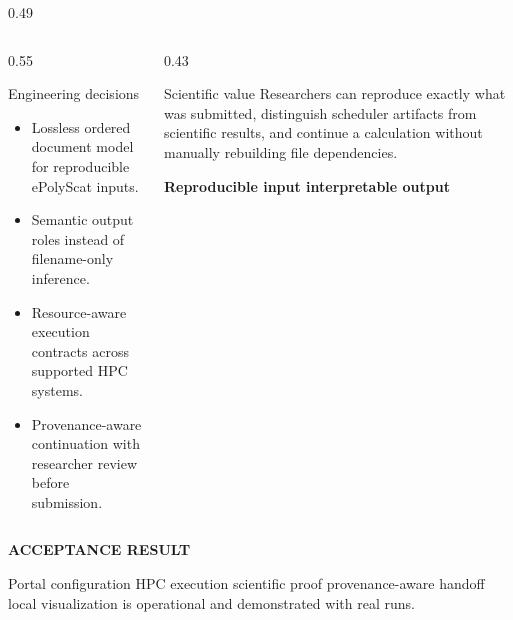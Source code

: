 \documentclass[final]{beamer}
\newcommand{\SmallCaps}[1]{%
  {\fontsize{15}{18}\selectfont\bfseries\color{PosterTealDark}\MakeUppercase{#1}}}
\begin{document}
\begin{frame}[t]
\begin{columns}[T,totalwidth=\textwidth]
\begin{column}{0.49\textwidth}
      \vspace{0.35cm}
      \begin{columns}[T,totalwidth=\linewidth]
        \begin{column}{0.55\linewidth}
          \begin{contentbox}[height=5.0cm]{Engineering decisions}
            {\fontsize{14.8}{17.2}\selectfont
            \begin{itemize}
              \setlength{\itemsep}{0cm}
              \item Lossless ordered document model for reproducible ePolyScat inputs.
              \item Semantic output roles instead of filename-only inference.
              \item Resource-aware execution contracts across supported HPC systems.
              \item Provenance-aware continuation with researcher review before submission.
            \end{itemize}}
          \end{contentbox}
        \end{column}
        \begin{column}{0.43\linewidth}
          \begin{contentbox}[height=5.0cm]{Scientific value}
            {\fontsize{14.5}{17.2}\selectfont
              Researchers can reproduce exactly what was submitted, distinguish scheduler artifacts from scientific results, and continue a calculation without manually rebuilding file dependencies.}
            \par\vspace{0.12cm}
            {\fontsize{12.5}{15}\selectfont\bfseries\color{PosterTealDark}
              Reproducible input \textrightarrow{} interpretable output}
          \end{contentbox}
        \end{column}
      \end{columns}

      \vspace{0.35cm}
      \begin{claimbox}[height=3.4cm,valign=center]
        \SmallCaps{Acceptance result}\par\vspace{0.08cm}
        {\fontsize{14.2}{17.0}\selectfont
          Portal configuration \textrightarrow{} HPC execution \textrightarrow{} scientific proof \textrightarrow{} provenance-aware handoff \textrightarrow{} local visualization is operational and demonstrated with real runs.}
      \end{claimbox}


\end{column}
\end{columns}
\end{frame}
\end{document}

